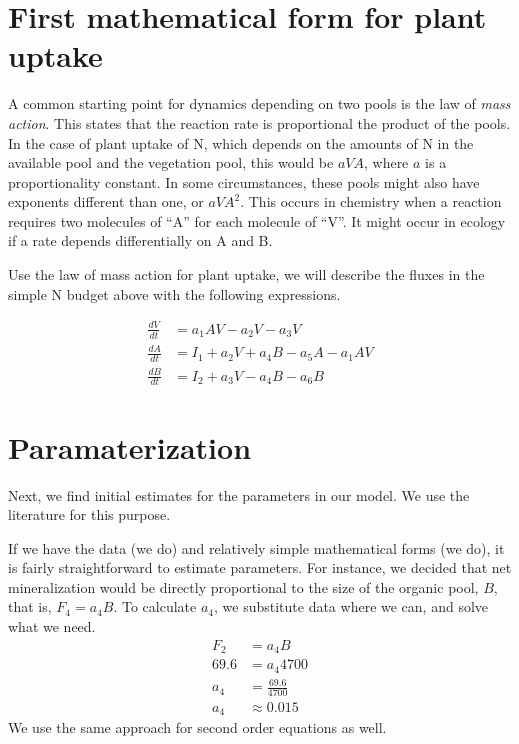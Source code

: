 \documentclass[
]{book}
\begin{document}
\hypertarget{first-mathematical-form-for-plant-uptake}{%
\section{First mathematical form for plant uptake}\label{first-mathematical-form-for-plant-uptake}}

A common starting point for dynamics depending on two pools is the law of \emph{mass action}. This states that the reaction rate is proportional the product of the pools. In the case of plant uptake of N, which depends on the amounts of N in the available pool and the vegetation pool, this would be \(aVA\), where \(a\) is a proportionality constant. In some circumstances, these pools might also have exponents different than one, or \(aVA^2\). This occurs in chemistry when a reaction requires two molecules of ``A'' for each molecule of ``V''. It might occur in ecology if a rate depends differentially on A and B.

Use the law of mass action for plant uptake, we will describe the fluxes in the simple N budget above with the following expressions.

\begin{align}
\frac{dV}{dt} &= a_{1}AV - a_{2}V - a_3 V\\
\frac{dA}{dt} &= I_1 + a_{2}V +  a_{4}B - a_{5}A - a_{1}AV\\
\frac{dB}{dt} &= I_2 + a_{3}V - a_{4}B - a_{6}B
\end{align}

\hypertarget{paramaterization}{%
\section{Paramaterization}\label{paramaterization}}

Next, we find initial estimates for the parameters in our model. We use the
literature for this purpose.

If we have the data (we do) and relatively simple mathematical forms
(we do), it is fairly straightforward to estimate parameters. For
instance, we decided that net mineralization would be directly
proportional to the size of the organic pool, \(B\), that is, \(F_4 = a_4B\). To calculate \(a_4\), we substitute data where we can, and solve
what we need.
\begin{align*}
  F_2 &= a_4 B\\
  69.6 &= a_4 4700 \\
  a_4 &= \frac{69.6}{4700}\\
  a_4 &\approx 0.015
\end{align*}
We use the same approach for second order equations as well.
\end{document}
